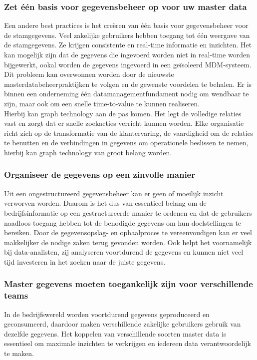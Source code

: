 \subsubsection{Zet één basis voor gegevensbeheer op voor uw master data}
Een andere best practices is het creëren van één basis voor gegevensbeheer voor de stamgegevens. Veel zakelijke gebruikers hebben toegang tot één weergave van de stamgegevens. Ze krijgen consistente en real-time informatie en inzichten. Het kan mogelijk zijn dat de gegevens die ingevoerd worden niet in real-time worden bijgewerkt, ookal worden de gegevens ingevoerd in een geïsoleerd MDM-systeem. Dit probleem kan overwonnen worden door de nieuwste masterdatabeheerpraktijken te volgen en de gewenste voordelen te behalen. Er is binnen een onderneming één datamanagementfundament nodig om wendbaar te zijn, maar ook om een snelle time-to-value te kunnen realiseren.
\\Hierbij kan graph technology aan de pas komen. Het legt de volledige relaties vast en zorgt dat er snelle zoekacties verricht kunnen worden. Elke organisatie richt zich op de transformatie van de klantervaring, de vaardigheid om de relaties te benutten en de verbindingen in gegevens om operationele beslissen te nemen, hierbij kan graph technology van groot belang worden. 

\subsubsection{Organiseer de gegevens op een zinvolle manier}
Uit een ongestructureerd gegevensbeheer kan er geen of moeilijk inzicht verworven worden. Daarom is het dus van essentieel belang om de bedrijfsinformatie op een gestructureerde manier te ordenen en dat de gebruikers naadloos toegang hebben tot de benodigde gegevens om hun doelstellingen te bereiken. Door de gegevensopslag- en ophaalproces te vereenvoudigen kan er veel makkelijker de nodige zaken terug gevonden worden. Ook helpt het voornamelijk bij data-analisten, zij analyseren voortdurend de gegevens en kunnen niet veel tijd investeren in het zoeken naar de juiste gegevens. 

\subsubsection{Master gegevens moeten toegankelijk zijn voor verschillende teams}
In de bedrijfswereld worden voortdurend gegevens geproduceerd en geconsumeerd, daardoor maken verschillende zakelijke gebruikers gebruik van dezelfde gegevens. Het koppelen van verschillende soorten master data is essentieel om maximale inzichten te verkrijgen en iedereen data verantwoordelijk te maken. 

